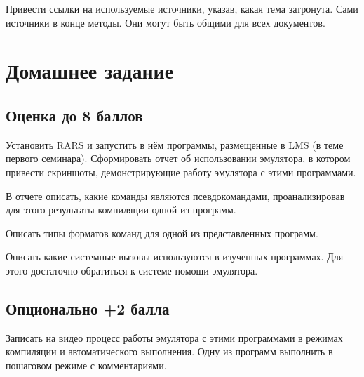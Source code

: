Привести ссылки на используемые источники, указав, какая тема затронута. Сами источники в конце методы. Они могут быть общими для всех документов.

\section{Домашнее задание}

\subsection{Оценка до 8 баллов}

Установить RARS и запустить в нём программы, размещенные в LMS (в теме первого семинара).  Сформировать отчет об использовании эмулятора, в котором привести скриншоты, демонстрирующие работу эмулятора с этими программами.

В отчете описать, какие команды являются псевдокомандами, проанализировав для этого результаты компиляции одной из программ.

Описать типы форматов команд для одной из представленных программ.

Описать какие системные вызовы используются в изученных программах. Для этого достаточно обратиться к системе помощи эмулятора.

\subsection{Опционально +2 балла}

Записать на видео процесс работы эмулятора с этими программами в режимах компиляции и автоматического выполнения. Одну из программ выполнить в пошаговом режиме с комментариями.
